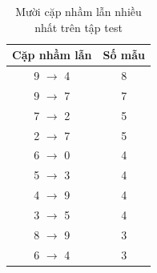 \begin{table}[H]
\centering
\caption{Mười cặp nhầm lẫn nhiều nhất trên tập test}
\label{tab:mnist-ann-top-errors}
\begin{tabular}{c c}
\toprule
Cặp nhầm lẫn & Số mẫu \\
\midrule
9 $\rightarrow$ 4 & 8 \\
9 $\rightarrow$ 7 & 7 \\
7 $\rightarrow$ 2 & 5 \\
2 $\rightarrow$ 7 & 5 \\
6 $\rightarrow$ 0 & 4 \\
5 $\rightarrow$ 3 & 4 \\
4 $\rightarrow$ 9 & 4 \\
3 $\rightarrow$ 5 & 4 \\
8 $\rightarrow$ 9 & 3 \\
6 $\rightarrow$ 4 & 3 \\
\bottomrule
\end{tabular}
\end{table}
